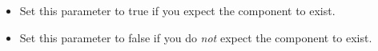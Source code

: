
\begin{itemize}
\item Set this parameter to true if you expect the component to exist.
\item Set this parameter to false if you do \emph{not} expect the component to exist.
\end{itemize}
